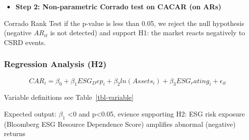 \documentclass[
  letterpaper,
  DIV=11,
  numbers=noendperiod]{scrartcl}
\providecommand{\tightlist}{%
  \setlength{\itemsep}{0pt}\setlength{\parskip}{0pt}}
\begin{document}
\begin{itemize}
\tightlist
\item
  \textbf{Step 2: Non-parametric Corrado test on CACAR (on ARs)}
\end{itemize}

Corrado Rank Test if the p-value is less than 0.05, we reject the null
hypothesis (negative \(AR_{it}\) is not detected) and support H1: the
market reacts negatively to CSRD events.

\subsubsection{Regression Analysis (H2)}\label{regression-analysis-h2}

\begin{equation}
CAR_{i} = \beta_0 + \beta_1ESG_Dep_i + \beta_2ln(Assets_i) + \beta_3ESG_rating_i + \epsilon_{it}
\end{equation}

Variable definitions see Table~\ref{tbl-variable}

\begin{table}

\caption{\label{tbl-variable}Variable Definition}


\end{table}%

Expected output: \(\beta_1\) \textless0 and p\textless0.05, evience
supporting H2: ESG risk exposure (Bloomberg ESG Resource Dependence
Score) amplifies abnormal (negative) returns
\end{document}
